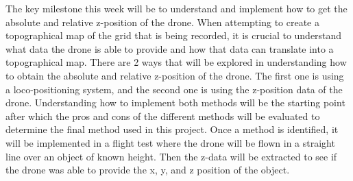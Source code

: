 The key milestone this week will be to understand and implement how to get the absolute and relative z-position of the drone. When attempting to create a topographical map of the grid that is being recorded, it is crucial to understand what data the drone is able to provide and how that data can translate into a topographical map. There are 2 ways that will be explored in understanding how to obtain the absolute and relative z-position of the drone. The first one is using a loco-positioning system, and the second one is using the z-position data of the drone. Understanding how to implement both methods will be the starting point after which the pros and cons of the different methods will be evaluated to determine the final method used in this project. Once a method is identified, it will be implemented in a flight test where the drone will be flown in a straight line over an object of known height. Then the z-data will be extracted to see if the drone was able to provide the x, y, and z position of the object. 

